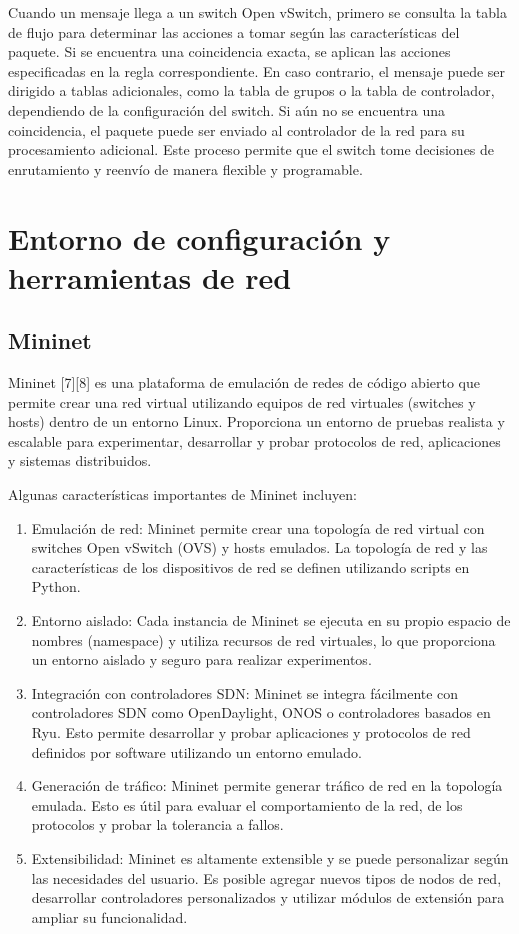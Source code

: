 \documentclass[a4paper, 12pt]{book}
\begin{document}
	Cuando un mensaje llega a un switch Open vSwitch, primero se consulta la tabla de flujo para determinar las acciones a tomar según las características del paquete. Si se encuentra una coincidencia exacta, se aplican las acciones especificadas en la regla correspondiente. En caso contrario, el mensaje puede ser dirigido a tablas adicionales, como la tabla de grupos o la tabla de controlador, dependiendo de la configuración del switch. Si aún no se encuentra una coincidencia, el paquete puede ser enviado al controlador de la red para su procesamiento adicional. Este proceso permite que el switch tome decisiones de enrutamiento y reenvío de manera flexible y programable.
	
	\section{Entorno de configuración y herramientas de red}
	\subsection{Mininet} 
	\label{sec:mininet}
	
	Mininet [7][8] es una plataforma de emulación de redes de código abierto que permite crear una red virtual utilizando equipos de red virtuales (switches y hosts) dentro de un entorno Linux. Proporciona un entorno de pruebas realista y escalable para experimentar, desarrollar y probar protocolos de red, aplicaciones y sistemas distribuidos.
	
	Algunas características importantes de Mininet incluyen:
	
	\begin{enumerate}
		\item 	Emulación de red: Mininet permite crear una topología de red virtual con switches Open vSwitch (OVS) y hosts emulados. La topología de red y las características de los dispositivos de red se definen utilizando scripts en Python.
		\item 	Entorno aislado: Cada instancia de Mininet se ejecuta en su propio espacio de nombres (namespace) y utiliza recursos de red virtuales, lo que proporciona un entorno aislado y seguro para realizar experimentos.
		\item 	Integración con controladores SDN: Mininet se integra fácilmente con controladores SDN como OpenDaylight, ONOS o controladores basados en Ryu. Esto permite desarrollar y probar aplicaciones y protocolos de red definidos por software utilizando un entorno emulado.
		\item 	Generación de tráfico: Mininet permite generar tráfico de red en la topología emulada. Esto es útil para evaluar el comportamiento de la red,  de los protocolos y probar la tolerancia a fallos.
		\item   Extensibilidad: Mininet es altamente extensible y se puede personalizar según las necesidades del usuario. Es posible agregar nuevos tipos de nodos de red, desarrollar controladores personalizados y utilizar módulos de extensión para ampliar su funcionalidad.
	\end{enumerate}
	
\end{document}
